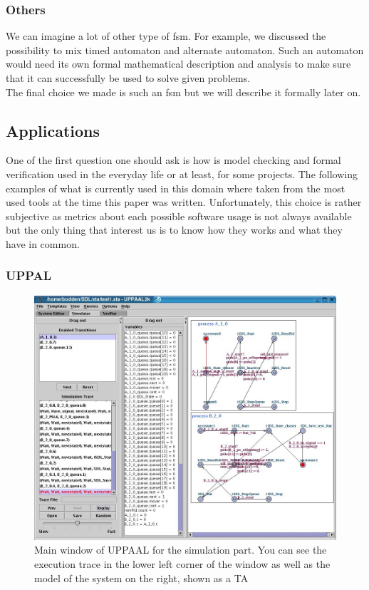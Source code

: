 \documentclass[12pt]{article}
\theoremstyle{definition}
\theoremstyle{definition}
\begin{document}
\subsubsection{Others}

We can imagine a lot of other type of \gls{fsm}. For example, we discussed the possibility to mix timed automaton and alternate automaton. Such an automaton would need its own formal mathematical description and analysis to make sure that it can successfully be used to solve given problems.\\

The final choice we made is such an \gls{fsm} but we will describe it formally later on.

\subsection{Applications}

One of the first question one should ask is how is model checking and formal verification used in the everyday life or at least, for some projects. The following examples of what is currently used in this domain where taken from the most used tools at the time this paper was written. Unfortunately, this choice is rather subjective as metrics about each possible software usage is not always available but the only thing that interest us is to know how they works and what they have in common.

\subsubsection{UPPAL}

\begin{figure}
    \centering
    \includegraphics[scale=0.3]{UPPAAL_trace.jpg}
    \caption{Main window of UPPAAL for the simulation part. You can see the execution trace in the lower left corner of the window as well as the model of the system on the right, shown as a TA}
    \label{UPPAAL}
\end{figure}
\end{document}
